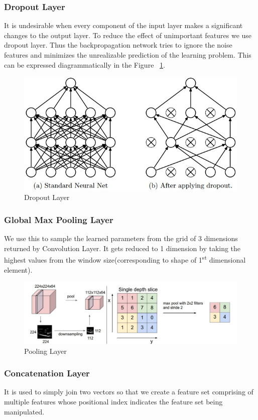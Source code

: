 \subsubsection{Dropout Layer}
It is undesirable when every component of the input layer makes a significant changes to the output layer. To reduce the effect of unimportant features we use dropout layer. Thus the backpropagation network tries to ignore the noise features and minimizes the unrealizable prediction of the learning problem. This can be expressed diagrammatically in the Figure ~\ref{fig:dropout}.
\begin{figure}
  [ht] \centering
  \includegraphics[width=.5\linewidth]{mainmatter/3-Methodology/images/dropout.jpeg}
  \caption{Dropout Layer}
  \label{fig:dropout}

\end{figure}

\subsubsection{Global Max Pooling Layer}
We use this to sample the learned parameters from the grid of 3 dimensions returned by Convolution Layer. It gets reduced to 1 dimension by taking the highest values from the window size(corresponding to shape of 1\textsuperscript{st} dimensional element).
\begin{figure}
  [ht]\centering
  \includegraphics[width=.75\linewidth]{mainmatter/3-Methodology/images/pooling.png}
  \caption{Pooling Layer}
  \label{fig:pool_layer}
\end{figure}

\subsubsection{Concatenation Layer}
It is used to simply join two vectors so that we create a feature set comprising of multiple features whose positional index indicates the feature set being manipulated.

